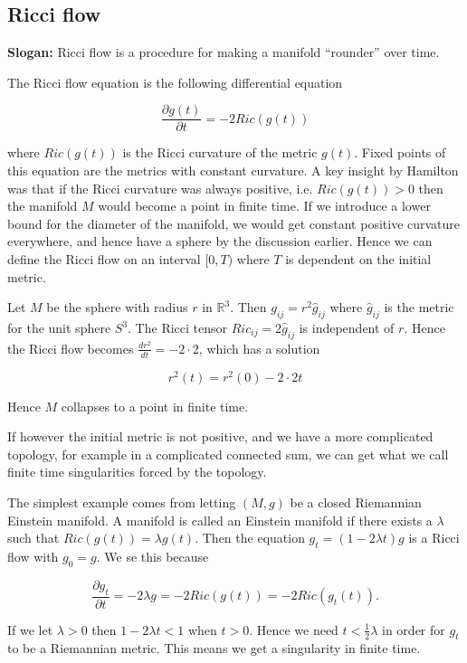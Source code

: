 \subsection{Ricci flow}

\textbf{Slogan:} Ricci flow is a procedure for making a manifold ``rounder'' over time. 

The Ricci flow equation is the following differential equation

$$\frac{\partial g(t)}{\partial t} = -2 Ric(g(t))$$

where $Ric(g(t))$ is the Ricci curvature of the metric $g(t)$. 
Fixed points of this equation are the metrics with constant curvature. 
A key insight by Hamilton was that if the Ricci curvature was always positive, i.e. $Ric(g(t))> 0$ then the manifold $M$ would become a point in finite time. 
If we introduce a lower bound for the diameter of the manifold, we would get constant positive curvature everywhere, and hence have a sphere by the discussion earlier. 
Hence we can define the Ricci flow on an interval $[0, T)$ where $T$ is dependent on the initial metric. 

\begin{example}
Let $M$ be the sphere with radius $r$ in $\mathbb{R}^3$. 
Then $g_{ij} = r^2\hat{g}_{ij}$ where $\hat{g}_{ij}$ is the metric for the unit sphere $S^3$. 
The Ricci tensor $Ric_{ij} = 2\hat{g}_{ij}$ is independent of $r$. 
Hence the Ricci flow becomes $\frac{dr^2}{dt} = -2\cdot 2$, which has a solution

$$r^2(t) = r^2(0)-2\cdot2t$$

Hence $M$ collapses to a point in finite time. 
\end{example}

If however the initial metric is not positive, and we have a more complicated topology, for example in a complicated connected sum, we can get what we call finite time singularities forced by the topology. 

\begin{example}
The simplest example comes from letting $(M, g)$ be a closed Riemannian Einstein manifold. 
A manifold is called an Einstein manifold if there exists a $\lambda$ such that $Ric(g(t)) = \lambda g(t)$. 
Then the equation $g_t = (1-2\lambda t)g$ is a Ricci flow with $g_0 = g$. 
We se this because 

$$\frac{\partial g_t}{\partial t}=-2\lambda g = -2 Ric(g(t)) = -2Ric(g_t(t)).$$

If we let $\lambda> 0$ then $1-2\lambda t < 1$ when $t>0$. 
Hence we need $t<\frac{1}{2}\lambda$ in order for $g_t$ to be a Riemannian metric. 
This means we get a singularity in finite time. 
\end{example}

